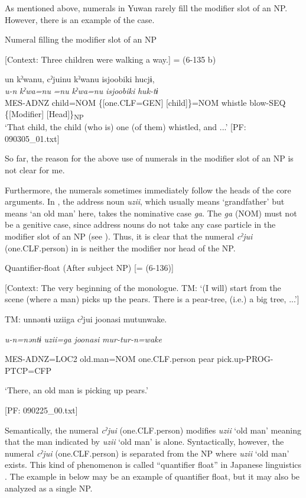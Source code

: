As mentioned above, numerals in Yuwan rarely fill the modifier slot of an NP. However, there is an example of the case.

\ea \label{ex:7:15}  Numeral filling the modifier slot of an NP

  [Context: Three children were walking a way.] = (6-135 b)

\gllll  un  kˀwanu,  cˀjuinu  kˀwanu  isjoobiki   hucjɨ,\\
\textit{u-n}  \textit{kˀwa=nu}  \textit{=nu}  \textit{kˀwa=nu}  \textit{isjoobiki} \textit{huk-tɨ}\\
MES-ADNZ  child=NOM  \{[one.CLF=GEN]  [child]\}=NOM  whistle   blow-SEQ\\
\{[Modifier]  [Head]\}\textsubscript{NP}      \\
\glt ‘That child, the child (who is) one (of them) whistled, and ...’ [PF: 090305\_01.txt]
\z

So far, the reason for the above use of numerals in the modifier slot of an NP is not clear for me.

Furthermore, the numerals sometimes immediately follow the heads of the core arguments. In , the address noun \textit{uzii}, which usually means ‘grandfather’ but means ‘an old man’ here, takes the nominative case \textit{ga}. The \textit{ga} (NOM) must not be a genitive case, since address nouns do not take any case particle in the modifier slot of an NP (see ). Thus, it is clear that the numeral \textit{cˀjui} (one.CLF.person) in  is neither the modifier nor head of the NP.

\ea \label{ex:7:16}  Quantifier-float (After subject NP) [= (6-136)]

  [Context: The very beginning of the monologue. TM: ‘(I will) start from the scene (where a man) picks up the pears. There is a pear-tree, (i.e.) a big tree, ...’]

  TM:  unnəntɨ  uziiga  cˀjui  joonasi   mutunwake.

    \textit{u-n=nəntɨ}  \textit{uzii=ga}  \textit{}  \textit{joonasi} \textit{mur-tur-n=wake}
                                                                           
    MES-ADNZ=LOC2  old.man=NOM  one.CLF.person  pear  pick.up-PROG-PTCP=CFP

    ‘There, an old man is picking up pears.’

    [PF: 090225\_00.txt]
\z

Semantically, the numeral \textit{cˀjui} (one.CLF.person) modifies \textit{uzii} ‘old man’ meaning that the man indicated by \textit{uzii} ‘old man’ is alone. Syntactically, however, the numeral \textit{cˀjui} (one.CLF.person) is separated from the NP where \textit{uzii} ‘old man’ exists. This kind of phenomenon is called “quantifier float” in Japanese linguistics \citep[286]{Shibatani1990}. The example in  below may be an example of quantifier float, but it may also be analyzed as a single NP.

